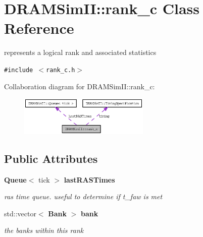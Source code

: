 \section{DRAMSimII::rank\_\-c Class Reference}
\label{class_d_r_a_m_sim_i_i_1_1rank__c}
represents a logical rank and associated statistics  


{\tt \#include $<$rank\_\-c.h$>$}

Collaboration diagram for DRAMSimII::rank\_\-c:\nopagebreak
\begin{figure}[H]
\begin{center}
\leavevmode
\includegraphics[width=176pt]{class_d_r_a_m_sim_i_i_1_1rank__c__coll__graph}
\end{center}
\end{figure}
\subsection*{Public Attributes}
\begin{CompactItemize}
\item 
{\bf Queue}$<$ tick $>$ {\bf lastRASTimes}\label{class_d_r_a_m_sim_i_i_1_1rank__c_8e8a12fb199828a742e3467b0dd669d3}

\begin{CompactList}\small\item\em ras time queue. useful to determine if t\_\-faw is met \item\end{CompactList}\item 
std::vector$<$ {\bf Bank} $>$ {\bf bank}\label{class_d_r_a_m_sim_i_i_1_1rank__c_0672c9ecd620fdb22502c4421a9d4bee}

\begin{CompactList}\small\item\em the banks within this rank \item\end{CompactList}\end{CompactItemize}

